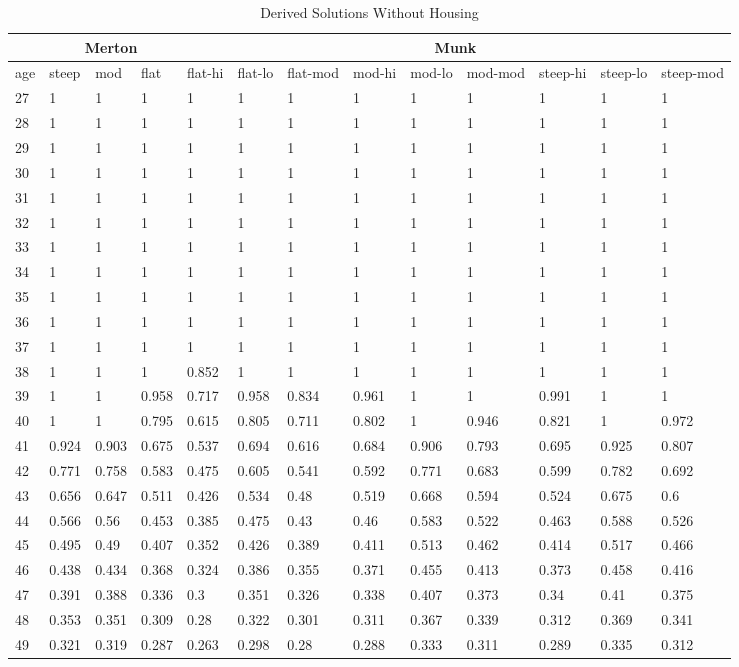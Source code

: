 \documentclass[]{article}
\begin{document}
\begin{appendix}
\begin{table}
	\centering
	\caption[]{Derived Solutions Without Housing}
	\begin{tabular}[c]{|l|p{0.9cm}|p{0.9cm}|p{0.9cm}|p{0.9cm}|p{0.9cm}|p{0.9cm}|p{0.9cm}|p{0.9cm}|p{0.9cm}|p{0.9cm}|p{0.9cm}|p{0.9cm}|}
		\hline
		&\multicolumn{3}{|c|}{Merton}&\multicolumn{9}{c|}{Munk}\\
		\hline
		age&steep&mod&flat&flat-hi&flat-lo&flat-mod&mod-hi&mod-lo&mod-mod&steep-hi&steep-lo&steep-mod\\
		\hline
27&1&1&1&1&1&1&1&1&1&1&1&1\\
28&1&1&1&1&1&1&1&1&1&1&1&1\\
29&1&1&1&1&1&1&1&1&1&1&1&1\\
30&1&1&1&1&1&1&1&1&1&1&1&1\\
31&1&1&1&1&1&1&1&1&1&1&1&1\\
32&1&1&1&1&1&1&1&1&1&1&1&1\\
33&1&1&1&1&1&1&1&1&1&1&1&1\\
34&1&1&1&1&1&1&1&1&1&1&1&1\\
35&1&1&1&1&1&1&1&1&1&1&1&1\\
36&1&1&1&1&1&1&1&1&1&1&1&1\\
37&1&1&1&1&1&1&1&1&1&1&1&1\\
38&1&1&1&0.852&1&1&1&1&1&1&1&1\\
39&1&1&0.958&0.717&0.958&0.834&0.961&1&1&0.991&1&1\\
40&1&1&0.795&0.615&0.805&0.711&0.802&1&0.946&0.821&1&0.972\\
41&0.924&0.903&0.675&0.537&0.694&0.616&0.684&0.906&0.793&0.695&0.925&0.807\\
42&0.771&0.758&0.583&0.475&0.605&0.541&0.592&0.771&0.683&0.599&0.782&0.692\\
43&0.656&0.647&0.511&0.426&0.534&0.48&0.519&0.668&0.594&0.524&0.675&0.6\\
44&0.566&0.56&0.453&0.385&0.475&0.43&0.46&0.583&0.522&0.463&0.588&0.526\\
45&0.495&0.49&0.407&0.352&0.426&0.389&0.411&0.513&0.462&0.414&0.517&0.466\\
46&0.438&0.434&0.368&0.324&0.386&0.355&0.371&0.455&0.413&0.373&0.458&0.416\\
47&0.391&0.388&0.336&0.3&0.351&0.326&0.338&0.407&0.373&0.34&0.41&0.375\\
48&0.353&0.351&0.309&0.28&0.322&0.301&0.311&0.367&0.339&0.312&0.369&0.341\\
49&0.321&0.319&0.287&0.263&0.298&0.28&0.288&0.333&0.311&0.289&0.335&0.312\\

\end{tabular}
\end{table}
\end{appendix}
\end{document}
